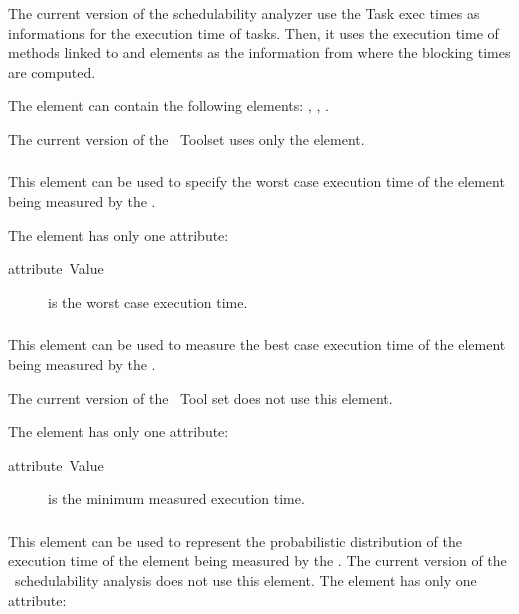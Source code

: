 The current version of the schedulability analyzer use the Task exec
times as informations for the execution time of tasks. Then, it uses
the execution time of methods linked to  and
 elements as the information from where the blocking
times are computed.

The  element can contain the following elements:
, , .

The current version of the \rtd\ Toolset uses only the 
element.


\subsubsection{}

This element can be used to specify the worst case execution time of
the element being measured by the .

The  element has only one attribute:
\begin{description}
\item [{attribute~Value}] is the worst case execution time.
\end{description}

\subsubsection{}

This element can be used to measure the best case execution time of
the element being measured by the .

The current version of the \rtd\ Tool set does not use this element.

The  element has only one attribute:
\begin{description}
\item [{attribute~Value}] is the minimum measured execution time.
\end{description}

\subsubsection{}

This element can be used to represent the probabilistic distribution
of the execution time of the element being measured by the
.  The current version of the \rtd\ schedulability
analysis does not use this element. The  element
has only one attribute:

